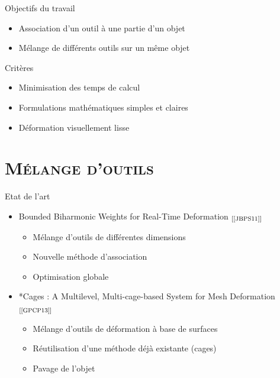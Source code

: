 \documentclass[xcolor=x11names,compress]{beamer}
\renewcommand{\(}{\begin{columns}} \renewcommand{\)}{\end{columns}}
\newcommand{\<}[1]{\begin{column}{#1}} \renewcommand{\>}{\end{column}}
\begin{document}
\begin{frame}{Objectifs du travail}
\begin{itemize}
\item Association d'un outil à une partie d'un objet
\item Mélange de différents outils sur un même objet
\end{itemize}
\begin{block}{Critères}
  \begin{itemize}
    \item Minimisation des temps de calcul
    \item Formulations mathématiques simples et claires
    \item Déformation visuellement lisse
  \end{itemize}
\end{block}
\end{frame}


\section{\scshape Mélange d'outils}

\begin{frame}{Etat de l'art}
\begin{itemize}
  \item Bounded Biharmonic Weights for Real-Time Deformation
  $_{[\text{\cite{JBPS11}}]}$
  \begin{itemize}
    \item Mélange d'outils de différentes dimensions
    \item Nouvelle méthode d'association
    \item Optimisation globale
  \end{itemize}
  \vspace{0.1in}
  \item *Cages : A Multilevel, Multi-cage-based System for Mesh Deformation 
  $_{[\text{\cite{GPCP13}}]}$
  \begin{itemize}
    \item Mélange d'outils de déformation à base de surfaces
    \item Réutilisation d'une méthode déjà existante (cages)
    \item Pavage de l'objet
  \end{itemize}
\end{itemize}
\end{frame}
\end{document}
